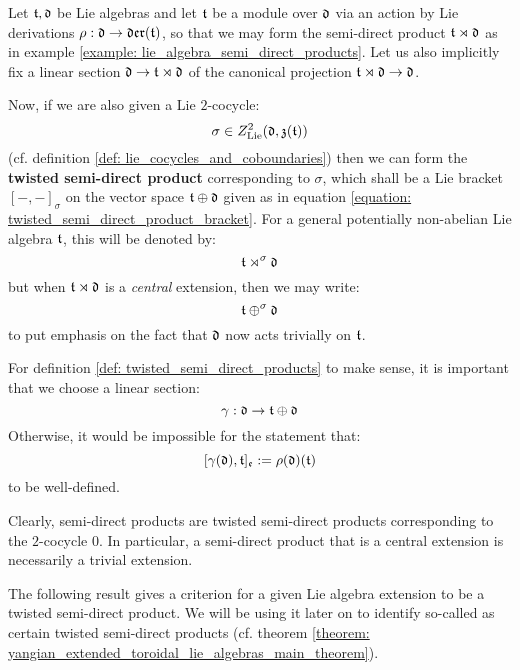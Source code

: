         \begin{definition} \label{def: twisted_semi_direct_products} 
            Let $\mathfrak{t}, \mathfrak{d}$ be Lie algebras and let $\mathfrak{t}$ be a module over $\mathfrak{d}$ via an action by Lie derivations $\rho: \mathfrak{d} \to \mathfrak{der}(\mathfrak{t})$, so that we may form the semi-direct product $\mathfrak{t} \rtimes \mathfrak{d}$ as in example \ref{example: lie_algebra_semi_direct_products}. Let us also implicitly fix a linear section $\mathfrak{d} \to \mathfrak{t} \rtimes \mathfrak{d}$ of the canonical projection $\mathfrak{t} \rtimes \mathfrak{d} \to \mathfrak{d}$.

            Now, if we are also given a Lie $2$-cocycle:
                $$\sigma \in Z^2_{\mathrm{Lie}}(\mathfrak{d}, \mathfrak{z}(\mathfrak{t}))$$
            (cf. definition \ref{def: lie_cocycles_and_coboundaries}) then we can form the \textbf{twisted semi-direct product} corresponding to $\sigma$, which shall be a Lie bracket $[-, -]_{\sigma}$ on the vector space $\mathfrak{t} \oplus \mathfrak{d}$ given as in equation \eqref{equation: twisted_semi_direct_product_bracket}. For a general potentially non-abelian Lie algebra $\mathfrak{t}$, this will be denoted by:
                $$\mathfrak{t} \rtimes^{\sigma} \mathfrak{d}$$
            but when $\mathfrak{t} \rtimes \mathfrak{d}$ is a \textit{central} extension, then we may write:
                $$\mathfrak{t} \oplus^{\sigma} \mathfrak{d}$$
            to put emphasis on the fact that $\mathfrak{d}$ now acts trivially on $\mathfrak{t}$.
        \end{definition}
        \begin{remark}
            For definition \ref{def: twisted_semi_direct_products} to make sense, it is important that we choose a linear section:
                $$\gamma: \mathfrak{d} \to \mathfrak{t} \oplus \mathfrak{d}$$
            Otherwise, it would be impossible for the statement that:
                $$[\gamma(\mathfrak{d}), \mathfrak{t}]_{\mathfrak{e}} := \rho(\mathfrak{d})(\mathfrak{t})$$
            to be well-defined.
        \end{remark}
        \begin{example}
            Clearly, semi-direct products are twisted semi-direct products corresponding to the $2$-cocycle $0$. In particular, a semi-direct product that is a central extension is necessarily a trivial extension.
        \end{example}
        The following result gives a criterion for a given Lie algebra extension to be a twisted semi-direct product. We will be using it later on to identify so-called  as certain twisted semi-direct products (cf. theorem \ref{theorem: yangian_extended_toroidal_lie_algebras_main_theorem}).
